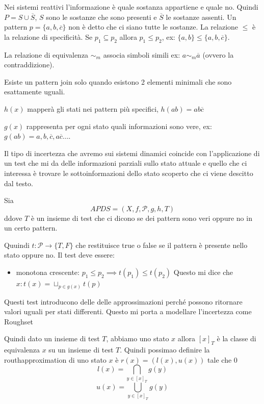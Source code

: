 \begin{esempio}
    Nei sistemi reattivi l'informazione è quale sostanza appartiene e quale no.
    Quindi $P=S\cup \overline{S}$, $S$ sono le sostanze che sono presenti e $\overline{S}$
    le sostanze assenti. Un pattern $p=\{a,b,\overline{c}\}$ non è detto che ci 
    siano tutte le sostanze. La relazione $\le$ è la relazione di specificità. Se 
    $p_1\subseteq p_2$ allora $p_1\le p_2$, ex: $\{a,b\}\le \{a,b,\overline{c}\}$.
    
    La relazione di equivalenza $\sim_m$ associa simboli simili ex: $a\sim_m \overline{a}$
    (ovvero la contraddizione). 

    Esiste un pattern join solo quando esistono 2 elementi minimali che sono esattamente
    uguali.

    $h(x)$ mapperà gli stati nei pattern più specifici, $h(ab) = ab\overline{c}$

    $g(x)$ rappresenta per ogni stato quali informazioni sono vere, ex: $g(ab)=a,b, \overline{c}, a\overline{c}\dots$.
\end{esempio}

Il tipo di incertezza che avremo sui sistemi dinamici coincide con l'applicazione 
di un test che mi da delle informazioni parziali sullo stato attuale e quello che 
ci interessa è trovare le sottoinformazioni dello stato scoperto che ci viene descitto 
dal testo.

\begin{definizione}
    Sia $$APDS= (X,f, \mathcal{P}, g,h,T)$$ ddove $T$ è un insieme di test che ci dicono 
    se dei pattern sono veri oppure no in un certo pattern.
\end{definizione}
\begin{definizione}
    Quuindi $t:\mathcal{P} \to \{T,F\}$ che restituisce true o false se il pattern 
    è presente nello stato oppure no. Il test deve essere:
    \begin{itemize}
        \item monotona crescente: $p_1\le p_2 \implies t(p_1)\le t(p_2)$
        Questo mi dice che $x:t(x)= \sqcup_{p\in g(x)} t(p)$
    \end{itemize}
\end{definizione}

Questi test introducono delle delle approssimazioni perché possono ritornare valori 
uguali per stati differenti. Questo mi porta a modellare l'incertezza come Roughset

Quindi dato un insieme di test $T$, abbiamo uno stato $x$ allora $[x]_T$ è la 
classe di equivalenza $x$ su un insieme di test $T$. Quindi possimao definire 
la routhapproximation di uno stato $x$ è $r(x) =(l(x), u(x))$ tale che 0
$$l(x) = \bigcap_{y\in [x]_T} g(y)$$
$$u(x) = \bigcup_{y\in [x]_T} g(y)$$


